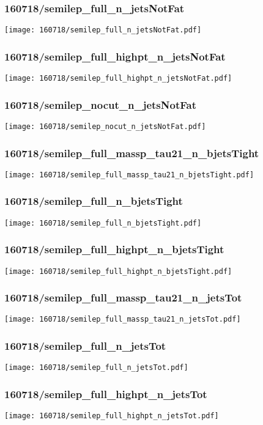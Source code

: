 \begin{frame}
   \frametitle{\small 160718/semilep\_full\_n\_jetsNotFat}
   \centering
   \texttt{[image: 160718/semilep\_full\_n\_jetsNotFat.pdf]}
\end{frame}

\begin{frame}
   \frametitle{\small 160718/semilep\_full\_highpt\_n\_jetsNotFat}
   \centering
   \texttt{[image: 160718/semilep\_full\_highpt\_n\_jetsNotFat.pdf]}
\end{frame}

\begin{frame}
   \frametitle{\small 160718/semilep\_nocut\_n\_jetsNotFat}
   \centering
   \texttt{[image: 160718/semilep\_nocut\_n\_jetsNotFat.pdf]}
\end{frame}

\begin{frame}
   \frametitle{\small 160718/semilep\_full\_massp\_tau21\_n\_bjetsTight}
   \centering
   \texttt{[image: 160718/semilep\_full\_massp\_tau21\_n\_bjetsTight.pdf]}
\end{frame}

\begin{frame}
   \frametitle{\small 160718/semilep\_full\_n\_bjetsTight}
   \centering
   \texttt{[image: 160718/semilep\_full\_n\_bjetsTight.pdf]}
\end{frame}

\begin{frame}
   \frametitle{\small 160718/semilep\_full\_highpt\_n\_bjetsTight}
   \centering
   \texttt{[image: 160718/semilep\_full\_highpt\_n\_bjetsTight.pdf]}
\end{frame}

\begin{frame}
   \frametitle{\small 160718/semilep\_full\_massp\_tau21\_n\_jetsTot}
   \centering
   \texttt{[image: 160718/semilep\_full\_massp\_tau21\_n\_jetsTot.pdf]}
\end{frame}

\begin{frame}
   \frametitle{\small 160718/semilep\_full\_n\_jetsTot}
   \centering
   \texttt{[image: 160718/semilep\_full\_n\_jetsTot.pdf]}
\end{frame}

\begin{frame}
   \frametitle{\small 160718/semilep\_full\_highpt\_n\_jetsTot}
   \centering
   \texttt{[image: 160718/semilep\_full\_highpt\_n\_jetsTot.pdf]}
\end{frame}


